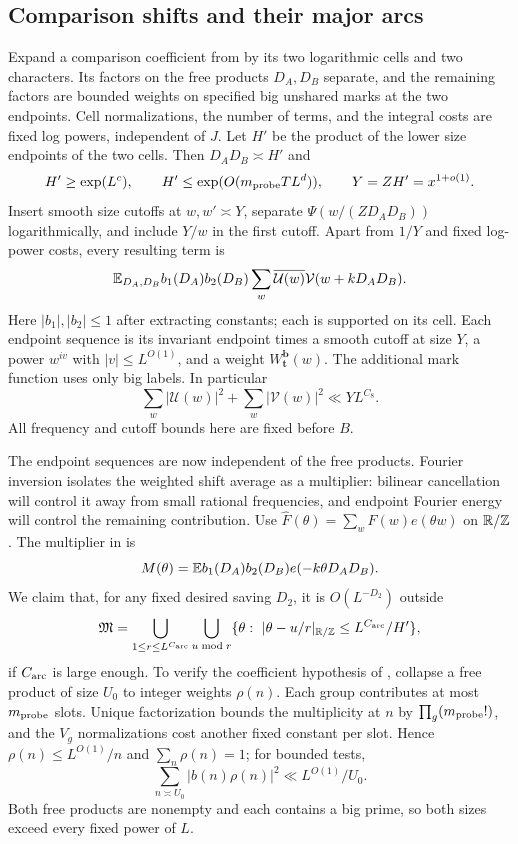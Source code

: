 \subsection{Comparison shifts and their major arcs}

Expand a comparison coefficient from  by
its two logarithmic cells and two characters. Its factors on the free
products $D_A,D_B$ separate, and the remaining factors are bounded
weights on specified big unshared marks at the two endpoints. Cell
normalizations, the number of terms, and the integral costs are fixed
log powers, independent of $J$. Let $H'$ be the product of the lower
size endpoints of the two cells. Then $D_AD_B\asymp H'$ and
\begin{equation}\label{eq:comparison-scales}
 H'\geq\exp(L^c),\qquad
 H'\leq\exp(O(m_{\rm probe}TL^d)),\qquad
 Y=ZH'=x^{1+o(1)}.
\end{equation}
Insert smooth size cutoffs at $w,w'\asymp Y$, separate
$\Psi(w/(ZD_AD_B))$ logarithmically, and include $Y/w$ in the first
cutoff. Apart from $1/Y$ and fixed log-power costs, every resulting
term is
\begin{equation}\label{eq:comparison-correlation}
 \mathbb E_{D_A,D_B}b_1(D_A)b_2(D_B)
         \sum_w\overline{\mathcal U(w)}\mathcal V(w+kD_AD_B).
\end{equation}
Here $|b_1|,|b_2|\leq1$ after extracting constants; each is supported
on its cell. Each endpoint sequence is its invariant endpoint times a
smooth cutoff at size $Y$, a power $w^{iv}$ with $|v|\leq L^{O(1)}$,
and a weight $W_{\mathbf t}^{\mathbf b}(w)$. The additional mark
function uses only big labels. In particular
\begin{equation}\label{eq:comparison-l2}
 \sum_w|\mathcal U(w)|^2+\sum_w|\mathcal V(w)|^2
        \ll YL^{C_8}.
\end{equation}
All frequency and cutoff bounds here are fixed before $B$.

The endpoint sequences are now independent of the free products.
Fourier inversion isolates the weighted shift average as a multiplier:
bilinear cancellation
will control it away from small rational frequencies, and endpoint
Fourier energy will control the remaining contribution.
Use $\widehat F(\theta)=\sum_w F(w)e(\theta w)$ on $\mathbb R/\mathbb Z$.
The multiplier in  is
\[
 M(\theta)=\mathbb E b_1(D_A)b_2(D_B)e(-k\theta D_AD_B).
\]
We claim that, for any fixed desired saving $D_2$, it is
$O(L^{-D_2})$ outside
\[
 \mathfrak M=\bigcup_{1\leq r\leq L^{C_{\rm arc}}}
       \bigcup_{u\bmod r}
       \{\theta:\ |\theta-u/r|_{\mathbb R/\mathbb Z}
                                  \leq L^{C_{\rm arc}}/H'\},
\]
if $C_{\rm arc}$ is large enough. To verify the coefficient hypothesis
of , collapse a free product of size $U_0$ to
integer weights $\rho(n)$. Each group contributes at most
$m_{\rm probe}$ slots. Unique factorization bounds the multiplicity
at $n$ by $\prod_g(m_{\rm probe}!)$, and the $V_g$ normalizations
cost another fixed constant per slot. Hence
$\rho(n)\leq L^{O(1)}/n$ and $\sum_n\rho(n)=1$; for bounded tests,
\[
 \sum_{n\asymp U_0}|b(n)\rho(n)|^2\ll L^{O(1)}/U_0.
\]
Both free products are nonempty and each contains a big prime, so
both sizes exceed every fixed power of $L$.

